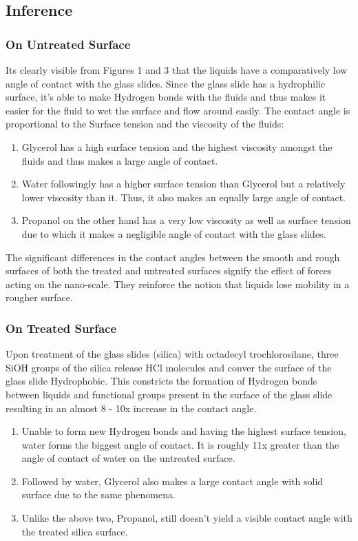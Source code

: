 \documentclass[pdflatex,sn-mathphys]{sn-jnl}%
\theoremstyle{thmstyleone}%
\theoremstyle{thmstyletwo}%
\theoremstyle{thmstylethree}%
\begin{document}
 \subsection{Inference}\label{subsec2}
\subsubsection{On Untreated Surface}\label{subsubsec2}
Its clearly visible from Figures 1 and 3 that the liquids have a comparatively low angle of contact with the glass slides. Since the glass slide has a hydrophilic surface, it's able to make Hydrogen bonds with the fluids and thus makes it easier for the fluid to wet the surface and flow around easily. 
The contact angle is proportional to the Surface tension and the viscosity of the fluids:
\begin{enumerate}
\item Glycerol has a high surface tension and the highest viscosity amongst the fluids and thus makes a large angle of contact.
\item Water followingly has a higher surface tension than Glycerol but a relatively lower viscosity than it. Thus, it also makes an equally large angle of contact.
\item Propanol on the other hand has a very low viscosity as well as surface tension due to which it makes a negligible angle of contact with the glass slides.
\end{enumerate}

The significant differences in the contact angles between the smooth and rough surfaces of both the treated and untreated surfaces signify the effect of forces acting on the nano-scale. They reinforce the notion that liquids lose mobility in a rougher surface.

\subsubsection{On Treated Surface}\label{subsubsec2}
Upon treatment of the glass slides (silica) with octadecyl trochlorosilane, three SiOH groups of the silica release HCl molecules and conver the surface of the glass slide Hydrophobic. This constricts the formation of Hydrogen bonds between liquids and functional groups present in the surface of the glass slide resulting in an almost 8 - 10x increase in the contact angle.
\begin{enumerate}
\item Unable to form new Hydrogen bonds and having the highest surface tension, water forms the biggest angle of contact. It is roughly 11x greater than the angle of contact of water on the untreated surface.
\item Followed by water, Glycerol also makes a large contact angle with solid surface due to the same phenomena.
\item Unlike the above two, Propanol, still doesn't yield a visible contact angle with the treated silica surface.
\end{enumerate}
\end{document}
